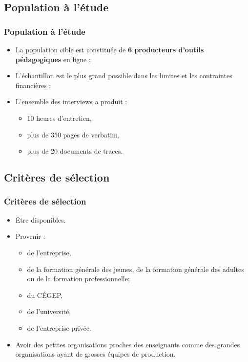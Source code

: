                      	\subsection{Population à l’étude} 
					\begin{frame}[allowframebreaks]
						\frametitle{Population à l’étude}
                        
                        			\begin{itemize} 
                       				 \item La population cible est constituée de \textbf{6 producteurs d’outils pédagogiques }en ligne ;										 \item L’échantillon est le plus grand possible dans les limites et les contraintes financières ; 
                       		              \item L’ensemble des interviews a produit :
                       		              \begin{itemize} 
                       		              	\item 10 heures d’entretien,
                       		              	\item plus de 350 pages de verbatim,
                       		              	\item plus de 20 documents de traces.
                       		              \end{itemize}
                       		 \end{itemize}
                       		 \end{frame}
				\subsection{Critères de sélection} 
					\begin{frame}[allowframebreaks]
						\frametitle{Critères de sélection}
                        
                        			\begin{itemize} 
                       				\item Être disponibles.
							\item Provenir :
							\begin{itemize}
								\item de l’entreprise, 
								\item de la formation générale des jeunes, de la formation générale des adultes ou de la formation professionnelle;
								\item du CÉGEP, 
								\item de l’université, 
								\item de l’entreprise privée.
							\end{itemize}
							\item Avoir des petites organisations proches des enseignants comme des grandes organisations ayant de grosses équipes de production.
                       		 \end{itemize}
                       		 \end{frame}
